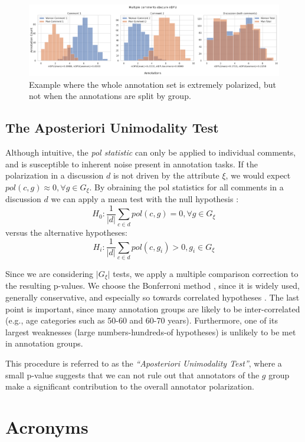 \documentclass{article}
\begin{document}
\begin{figure}
	\centering
	\includegraphics[width=\linewidth]{ndfu_multi_comments.png}
	\caption{Example where the whole annotation set is extremely polarized, but not when the annotations are split by group.}
	\label{fig:ndfu_multi_comment}
\end{figure}



\subsection{The Aposteriori Unimodality Test}
\label{ssec:methodology:aposteriori}

Although intuitive, the \textit{pol statistic} can only be applied to individual comments, and is susceptible to inherent noise present in annotation tasks. If the polarization in a discussion $d$ is not driven by the attribute $\xi$, we would expect $pol(c, g) \approx 0,  \forall g \in G_{\xi}$. By obraining the pol statistics for all comments in a discussion $d$ we can apply a mean test with the null hypothesis :
\begin{equation}
	H_0: \frac{1}{\lvert d \rvert} \sum\limits_{c \in d} pol(c, g) = 0, \forall g \in G_{\xi}
\end{equation}
\noindent versus the alternative hypotheses: 
\begin{equation}
	H_i:  \frac{1}{\lvert d \rvert} \sum\limits_{c \in d}  pol(c, g_i) > 0, g_i \in G_{\xi}
\end{equation}

Since we are considering $\lvert G_{\xi} \rvert$ tests, we apply a multiple comparison correction to the resulting p-values. We choose the Bonferroni method \parencite{Bland170}, since it is widely used, generally conservative, and especially so towards correlated hypotheses \parencite{ChenFengYi2017}. The last point is important, since many annotation groups are likely to be inter-correlated (e.g., age categories such as 50-60 and 60-70 years). Furthermore, one of its largest weaknesses (large numbers-hundreds-of hypotheses) is unlikely to be met in annotation groups.

This procedure is referred to as the \textit{``Aposteriori Unimodality Test''}, where a small p-value suggests that we can not rule out that annotators of the $g$ group make a significant contribution to the overall annotator polarization.


\section{Acronyms}

\begin{acronym}[WWW]
\end{acronym}

\printbibliography
\end{document}
